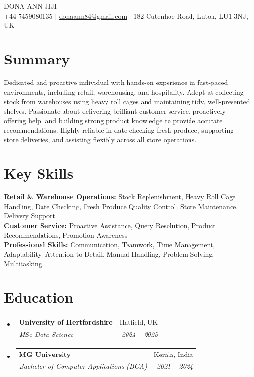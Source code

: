 \documentclass[a4paper,11pt]{article}
\makeatletter
\newcommand{\resumeSubheading}[4]{
  \item
    \begin{tabular*}{0.97\textwidth}[t]{l@{\extracolsep{\fill}}r}
      \textbf{#1} & #2 \\
      \textit{\small#3} & \textit{\small #4} \\
    \end{tabular*}\vspace{-5pt}
}
\newcommand{\resumeSubHeadingListStart}{\begin{itemize}[leftmargin=0.15in, label={}]}
\newcommand{\resumeSubHeadingListEnd}{\end{itemize}}
\makeatother
\begin{document}
\begin{center}
    {\Huge \scshape DONA ANN JIJI} \\ \vspace{4pt}
    \small
    +44 7459080135 $|$
    \href{mailto:donaann84@gmail.com}{donaann84@gmail.com} $|$
    182 Cutenhoe Road, Luton, LU1 3NJ, UK
\end{center}

\section{Summary}
Dedicated and proactive individual with hands-on experience in fast-paced environments, including retail, warehousing, and hospitality. Adept at collecting stock from warehouses using heavy roll cages and maintaining tidy, well-presented shelves. Passionate about delivering brilliant customer service, proactively offering help, and building strong product knowledge to provide accurate recommendations. Highly reliable in date checking fresh produce, supporting store deliveries, and assisting flexibly across all store operations.

\section{Key Skills}
\begin{itemize}[leftmargin=0.15in, label={}]
  \small{\item{
    \textbf{Retail \& Warehouse Operations:} Stock Replenishment, Heavy Roll Cage Handling, Date Checking, Fresh Produce Quality Control, Store Maintenance, Delivery Support \\
    \textbf{Customer Service:} Proactive Assistance, Query Resolution, Product Recommendations, Promotion Awareness \\
    \textbf{Professional Skills:} Communication, Teamwork, Time Management, Adaptability, Attention to Detail, Manual Handling, Problem-Solving, Multitasking
  }}
\end{itemize}

\section{Education}
\resumeSubHeadingListStart
  \resumeSubheading
    {University of Hertfordshire}{Hatfield, UK}
    {MSc Data Science}{2024 -- 2025}
  \resumeSubheading
    {MG University}{Kerala, India}
    {Bachelor of Computer Applications (BCA)}{2021 -- 2024}
\resumeSubHeadingListEnd
\end{document}
